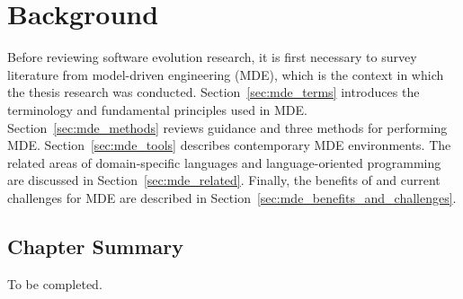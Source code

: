 
\chapter{Background}
\label{Background}

Before reviewing software evolution research, it is first necessary to survey literature from model-driven engineering (MDE), which is the context in which the thesis research was conducted. Section~\ref{sec:mde_terms} introduces the terminology and fundamental principles used in MDE. Section~\ref{sec:mde_methods} reviews guidance and three methods for performing MDE. Section~\ref{sec:mde_tools} describes contemporary MDE environments. The related areas of domain-specific languages and language-oriented programming are discussed in Section~\ref{sec:mde_related}. Finally, the benefits of and current challenges for MDE are described in Section~\ref{sec:mde_benefits_and_challenges}.







\section{Chapter Summary}
To be completed.